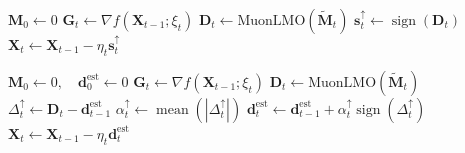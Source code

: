 \noindent
\begin{minipage}[t]{0.49\linewidth}
\setlength{\algwidth}{\linewidth}
\vspace{0pt}
\begin{algorithm}[H]
\algnarrow
    \caption{SignMuon}
    \label{central_alg}
    \begin{algorithmic}[1]
    \State $\mathbf{M}_0 \gets 0$
        \State $\mathbf{G}_t \gets \nabla f(\mathbf{X}_{t-1};\xi_t)$
        \State {}
        \State $\mathbf{D}_t \gets \mathrm{MuonLMO}(\tilde{\mathbf{M}}_t)$
        \State $\mathbf{s}_t^{\uparrow} \gets \operatorname{sign}(\mathbf{D}_t)$
        \State $\mathbf{X}_{t} \gets \mathbf{X}_{t-1} - \eta_t \mathbf{s}_t^{\uparrow}$
    \EndFor
    \end{algorithmic}
\end{algorithm}

\end{minipage}\hfill
\begin{minipage}[t]{0.49\linewidth}
\setlength{\algwidth}{\linewidth}
\vspace{0pt}
\begin{algorithm}[H]
\algnarrow
    \caption{EF21-SignMuon}
    \label{ef21_signmuon}
    \begin{algorithmic}[1]
    \State $\mathbf{M}_0 \gets 0,\quad \mathbf{d}_0^{\mathrm{est}} \gets 0$
        \State $\mathbf{G}_t \gets \nabla f(\mathbf{X}_{t-1};\xi_t)$
        \State {}
        \State $\mathbf{D}_t \gets \mathrm{MuonLMO}(\tilde{\mathbf{M}}_t)$
        \State $\Delta_t^{\uparrow} \gets \mathbf{D}_t - \mathbf{d}_{t-1}^{\mathrm{est}}$
        \State $\alpha_t^{\uparrow} \gets \operatorname{mean}(|\Delta_t^{\uparrow}|)$
        \State $\mathbf{d}_{t}^{\mathrm{est}} \gets \mathbf{d}_{t-1}^{\mathrm{est}} + \alpha_t^{\uparrow}\operatorname{sign}(\Delta_t^{\uparrow})$
        \State $\mathbf{X}_{t} \gets \mathbf{X}_{t-1} - \eta_t \mathbf{d}_{t}^{\mathrm{est}}$
    \EndFor
    \end{algorithmic}
\end{algorithm}

\end{minipage}
\par\medskip
\noindent
